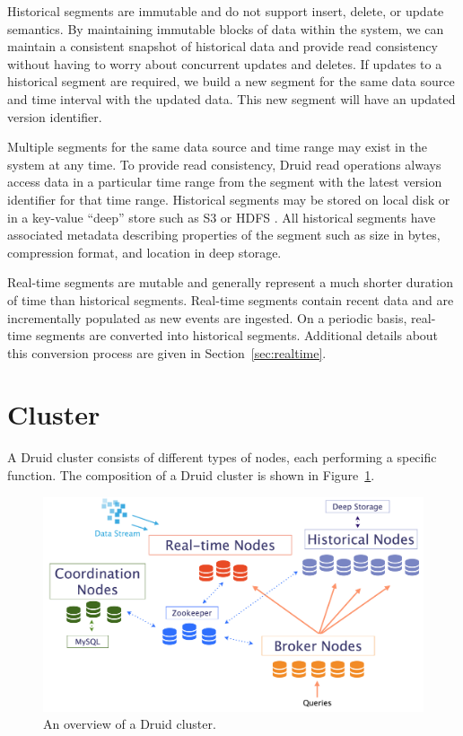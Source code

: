 \documentclass{vldb}
\begin{document}
Historical segments are immutable and do not support insert, delete,
or update semantics. By maintaining immutable blocks of data within
the system, we can maintain a consistent snapshot of historical
data and provide read consistency without having to worry about
concurrent updates and deletes. If updates to a historical segment are
required, we build a new segment for the same data source and time
interval with the updated data. This new segment will have an updated version identifier.

Multiple segments for the same data source and time range
may exist in the system at any time. To provide read consistency,
Druid read operations always access data in a particular time range
from the segment with the latest version identifier for that time
range. Historical segments may be stored on local disk or in a
key-value “deep” store such as S3 \cite{decandia2007dynamo} or HDFS \cite{shvachko2010hadoop}. All historical
segments have associated metadata describing properties of the segment
such as size in bytes, compression format, and location in deep
storage.

Real-time segments are mutable and generally represent a much shorter
duration of time than historical segments. Real-time segments contain
recent data and are incrementally populated as new events are
ingested. On a periodic basis, real-time segments are converted into
historical segments. Additional details about this conversion process
are given in Section~\ref{sec:realtime}.

\section{Cluster}
\label{sec:cluster}
A Druid cluster consists of different types of nodes, each performing
a specific function. The composition of a Druid cluster is shown in
Figure~\ref{fig:druid_cluster}.

\begin{figure}
\centering
\includegraphics[width = 5.2in]{druid_cluster}
\caption{An overview of a Druid cluster.}
\label{fig:druid_cluster}
\end{figure}
\end{document}
